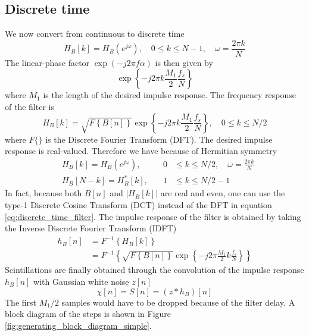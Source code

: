 \subsection{Discrete time}
We now convert from continuous to discrete time
\begin{equation}
 H_B[k] = H_B(e^{j\omega}), \quad 0 \leq k \leq N-1, \quad  \omega = \frac{2 \pi k}{N}
\end{equation}
The linear-phase factor $\exp{\left(-j 2\pi f \alpha\right)}$ is then given by
\begin{equation}
 \exp \left\{ -j 2\pi k \frac{M_1}{2} \frac{f_s}{N} \right\}
\end{equation}
where $M_1$ is the length of the desired impulse response. The frequency response of the filter is
\begin{equation}\label{eq:discrete_time_filter}
 H_B[k] =  \sqrt{ F \left\{  B[n] \right\}  } \exp \left\{ -j 2\pi k \frac{M_1}{2} \frac{f_s}{N} \right\},  \quad 0 \leq k \leq N/2
\end{equation}
where $F\{\}$ is the Discrete Fourier Transform (DFT).
The desired impulse response is real-valued. Therefore we have because of Hermitian symmetry
\begin{equation}
\begin{aligned}
 &H_B[k] = H_B(e^{j\omega}), &\quad 0 &\leq k \leq N/2, \quad  \omega = \frac{2 \pi k}{N} \\
 &H_B[N-k] = H_B^{*} [k], &\quad 1 &\leq k \leq N/2 - 1
\end{aligned}
\end{equation}
In fact, because both $B[n]$ and $|H_B[k]|$ are real and even, one can use the type-1 Discrete Cosine Transform (DCT) instead of the DFT in equation \eqref{eq:discrete_time_filter}.
The impulse response of the filter is obtained by taking the Inverse Discrete Fourier Transform (IDFT)
\begin{equation}
 \begin{aligned}
 h_B[n] &= F^{-1} \left\{ H_B[k] \right\} \\
  &= F^{-1} \left\{ \sqrt{ F \left\{  B[n] \right\}  } \exp \left\{ -j 2\pi \frac{M_1}{2} k \frac{f_s}{N} \right\} \right\}
\end{aligned}
\end{equation}
Scintillations are finally obtained through the convolution of the impulse response $h_B[n]$ with Gaussian white noise $z[n]$
\begin{equation}\label{eq:scintillations_convolution_discrete}
 \chi[n] = S[n] = (z \ast h_B ) [n]
\end{equation}
The first $M_1/2$ samples would have to be dropped because of the filter delay.
A block diagram of the steps is shown in Figure \ref{fig:generating_block_diagram_simple}.

